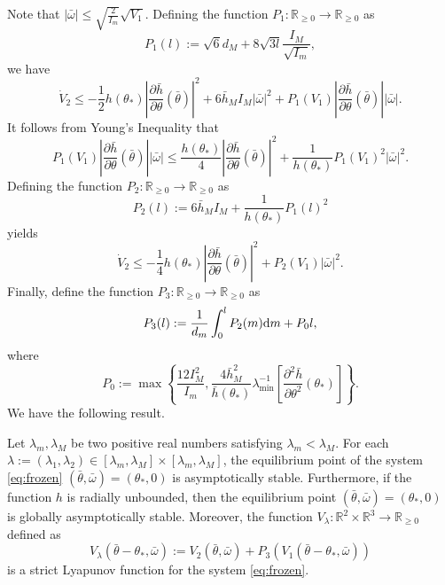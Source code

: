 \documentclass{ifacconf}
\begin{document}
Note that $|\bar{\omega}|\le \sqrt{\frac{2}{I_m}}\sqrt{V_1}$. Defining the function $P_1:\mathbb{R}_{\ge 0}\to\mathbb{R}_{\ge 0}$ as
\begin{equation}
    P_1(l):=\sqrt{6} d_M+8\sqrt{3 l}\frac{I_M}{\sqrt{I_m}},
\end{equation}
we have
\begin{equation*}
    \dot{V}_2\le -\frac{1}{2}    h(\theta_*) \left|\frac{\partial \bar{h}}{\partial \theta}(\bar{\theta}) \right|^2+  6\bar{h}_MI_M|\bar{\omega}|^2  + P_1(V_1)\left|\frac{\partial \bar{h}}{\partial \theta}(\bar{\theta}) \right||\bar{\omega}|.
\end{equation*}
It follows from Young's Inequality that
\begin{equation*}
    P_1(V_1)\left|\frac{\partial \bar{h}}{\partial \theta}(\bar{\theta}) \right||\bar{\omega}|\le \frac{h(\theta_*)}{4}\left|\frac{\partial \bar{h}}{\partial \theta}(\bar{\theta}) \right|^2 + \frac{1}{h(\theta_*)}P_1(V_1)^2 |\bar{\omega}|^2.
\end{equation*}
Defining the function $P_2:\mathbb{R}_{\ge 0}\to\mathbb{R}_{\ge 0}$ as
\begin{equation}
    P_2(l):=6\bar{h}_MI_M + \frac{1}{h(\theta_*)}P_1(l)^2
\end{equation}
yields
\begin{equation}
    \dot{V}_2\le -\frac{1}{4}    h(\theta_*) \left|\frac{\partial \bar{h}}{\partial \theta}(\bar{\theta}) \right|^2+ P_2(V_1)|\bar{\omega}|^2.
\end{equation}
Finally, define the function $P_3:\mathbb{R}_{\ge 0}\to\mathbb{R}_{\ge 0}$ as
\begin{equation}
    P_3(l):=\frac{1}{d_m}\int_0^l P_2(m){\rm d}m + P_0 l,
\end{equation}
where
\begin{equation}
    P_0:=\max\left\{\frac{12I_M^2}{I_m},\frac{4\bar{h}^2_M}{\bar{h}(\theta_*)}\lambda_{\min}^{-1}\left[ \frac{\partial^2\bar{h}}{\partial \theta^2}(\theta_*)\right]\right\}.
\end{equation}
We have the following result.
\begin{prop}\label{prop:2}
    Let $\lambda_m,\lambda_M$ be two positive real numbers satisfying $\lambda_m<\lambda_M$. For each $\lambda:=(\lambda_1,\lambda_2)\in[\lambda_m,\lambda_M]\times [\lambda_m,\lambda_M]$, the equilibrium point of the system \eqref{eq:frozen} $(\bar{\theta},\bar{\omega})=(\theta_*,0)$ is asymptotically stable. Furthermore, if the function $h$ is radially unbounded, then the equilibrium point $(\bar{\theta},\bar{\omega})=(\theta_*,0)$ is globally asymptotically stable. Moreover, the function $V_\lambda:\mathbb{R}^2\times\mathbb{R}^3\to\mathbb{R}_{\ge 0}$ defined as
    \begin{equation}
        V_\lambda(\bar{\theta}-\theta_*,\bar{\omega}):=V_2(\bar{\theta},\bar{\omega})+P_3(V_1(\bar{\theta}-\theta_*,\bar{\omega}))
    \end{equation}
    is a strict Lyapunov function for the system \eqref{eq:frozen}.
\end{prop}
\end{document}
